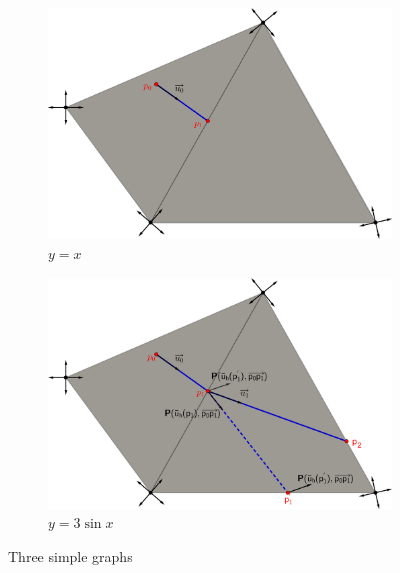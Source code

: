 \begin{figure}[!h]
     \centering
     \begin{subfigure}[b]{0.7\textwidth}
         \centering
         \includegraphics[width=\textwidth]{images/draw_streams_11.pdf}
         \caption{$y=x$}
         \label{fig:y equals x}
     \end{subfigure}
     \begin{subfigure}[b]{0.7\textwidth}
         \centering
         \includegraphics[width=\textwidth]{images/draw_streams_12.pdf}
         \caption{$y=3\sin x$}
         \label{fig:three sin x}
     \end{subfigure}
        \caption{Three simple graphs}
        \label{fig:draw_streams_1}
\end{figure}


